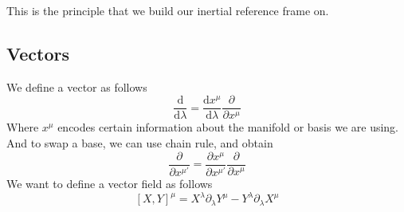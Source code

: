 \documentclass[12pt]{book}
\newcommand{\pypx}[2]{\frac{\partial #1}{\partial #2}}
\newcommand{\dydx}[2]{\frac{\text{d} #1}{\text{d} #2}}
\newcommand{\sqbkt}[1]{\left[ #1 \right]}
\begin{document}
This is the principle that we build our inertial reference frame on. 

\subsection{Vectors}
We define a vector as follows
\[
\dydx{}{\lambda} = \dydx{x^\mu}{\lambda}\pypx{}{x^\mu}
\]
Where $x^\mu$ encodes certain information about the manifold or basis we are using. And to swap a base, we can use chain rule, and obtain
\[
\pypx{}{x^{\mu'}} = \pypx{x^{\mu}}{x^{\mu'}}\pypx{}{x^{\mu}}
\]
We want to define a vector field as follows
\[
\sqbkt{X,Y}^\mu = X^{\lambda}\partial_{\lambda}Y^{\mu}-Y^{\lambda}\partial_{\lambda}X^{\mu}
\]
\end{document}
